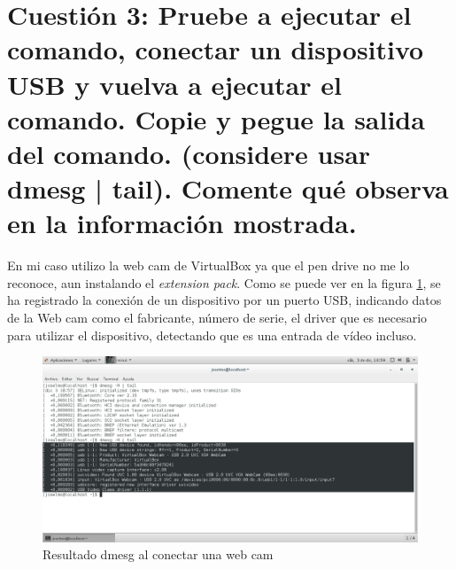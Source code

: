 
\section{Cuestión 3: Pruebe a ejecutar el comando, conectar un dispositivo USB y vuelva a ejecutar el comando. Copie y pegue la salida del comando. (considere usar dmesg | tail). Comente qué observa en la información mostrada.}
En mi caso utilizo la web cam de VirtualBox ya que el pen drive no me lo reconoce, aun instalando
el \textit{extension pack}.
Como se puede ver en la figura \ref{fig:P3_3_1}, se ha registrado la conexión de un dispositivo por
un puerto USB, indicando datos de la Web cam como el fabricante, número de serie, el driver que 
es necesario para utilizar el dispositivo, detectando que es una entrada de vídeo incluso.

\begin{figure}[H] %
\centering
\includegraphics[scale=0.4]{./imagenes/P3_3_1.png} 
\caption{Resultado dmesg al conectar una web cam} \label{fig:P3_3_1}
\end{figure}


